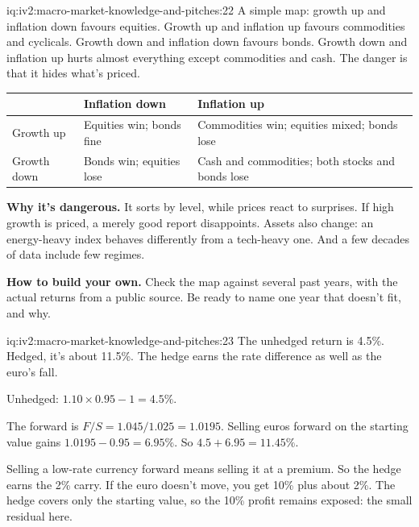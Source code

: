 \begin{solution}{iq:iv2:macro-market-knowledge-and-pitches:22}
A simple map: growth up and inflation down favours equities. Growth up and inflation up favours commodities and cyclicals. Growth down and inflation down favours bonds. Growth down and inflation up hurts almost everything except commodities and cash. The danger is that it hides what's priced.

\begin{center}
\begin{tabular}{lll}
\toprule
 & Inflation down & Inflation up \\
\midrule
Growth up & Equities win; bonds fine & Commodities win; equities mixed; bonds lose \\
Growth down & Bonds win; equities lose & Cash and commodities; both stocks and bonds lose \\
\bottomrule
\end{tabular}
\end{center}

\textbf{Why it's dangerous.} It sorts by level, while prices react to surprises. If high growth is priced, a merely good report disappoints. Assets also change: an energy-heavy index behaves differently from a tech-heavy one. And a few decades of data include few regimes.

\textbf{How to build your own.} Check the map against several past years, with the actual returns from a public source. Be ready to name one year that doesn't fit, and why.

\end{solution}

\begin{solution}{iq:iv2:macro-market-knowledge-and-pitches:23}
The unhedged return is 4.5\%. Hedged, it's about 11.5\%. The hedge earns the rate difference as well as the euro's fall.

Unhedged: $1.10 \times 0.95 - 1 = 4.5\%$.

The forward is $F/S = 1.045/1.025 = 1.0195$. Selling euros forward on the starting value gains $1.0195 - 0.95 = 6.95\%$. So $4.5 + 6.95 = 11.45\%$.

Selling a low-rate currency forward means selling it at a premium. So the hedge earns the 2\% carry. If the euro doesn't move, you get 10\% plus about 2\%. The hedge covers only the starting value, so the 10\% profit remains exposed: the small residual here.

\end{solution}

